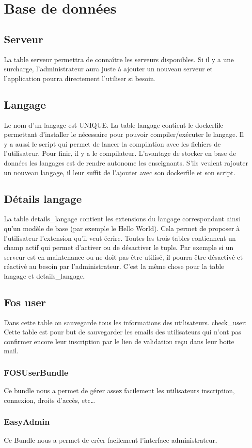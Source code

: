 \section{Base de données}

\subsection{Serveur}

\par La table serveur permettra de connaître les serveurs disponibles. Si il y a une surcharge, l’administrateur aura juste à ajouter un nouveau serveur et l’application pourra directement l’utiliser si besoin.

\subsection{Langage}

\par Le nom d’un langage est UNIQUE. La table langage contient le dockerfile permettant d’installer le nécessaire pour pouvoir compiler/exécuter le langage. Il y a aussi le script qui permet de lancer la compilation avec les fichiers de l’utilisateur. Pour finir, il y a le compilateur. 
L’avantage de stocker en base de données les langages est de rendre autonome les enseignants. S’ils veulent rajouter un nouveau langage, il leur suffit de l’ajouter avec son dockerfile et son script.

\subsection{Détails langage}

\par La table details\_langage contient les extensions du langage correspondant ainsi qu’un modèle de base (par exemple le Hello World). Cela permet de proposer à l’utilisateur l’extension qu’il veut écrire.
Toutes les trois tables contiennent un champ actif qui permet d’activer ou de désactiver le tuple. Par exemple si un serveur est en maintenance ou ne doit pas être utilisé, il pourra être désactivé et réactivé au besoin par l’administrateur. C’est la même chose pour la table langage et details\_langage.

\subsection{Fos user}

\par Dans cette table on sauvegarde tous les informations des utilisateurs.
check\_user: 
Cette table est pour but de sauvegarder les emails des utilisateurs  qui n’ont pas confirmer encore leur inscription par  le lien de validation reçu dans leur boite mail. 

\subsubsection{FOSUserBundle}

\par Ce bundle nous a permet de gérer assez facilement les utilisateurs  inscription, connexion, droits d’accès, etc…

\subsubsection{EasyAdmin}

\par Ce Bundle nous a permet de créer facilement l’interface administrateur.